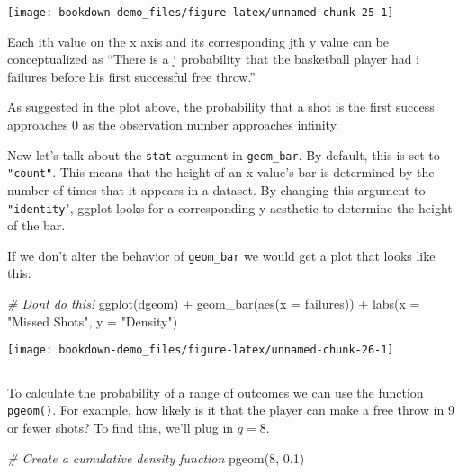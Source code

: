 \documentclass[
]{book}
\newenvironment{Shaded}{\begin{snugshade}}{\end{snugshade}}
\newcommand{\AttributeTok}[1]{\textcolor[rgb]{0.77,0.63,0.00}{#1}}
\newcommand{\CommentTok}[1]{\textcolor[rgb]{0.56,0.35,0.01}{\textit{#1}}}
\newcommand{\DecValTok}[1]{\textcolor[rgb]{0.00,0.00,0.81}{#1}}
\newcommand{\FloatTok}[1]{\textcolor[rgb]{0.00,0.00,0.81}{#1}}
\newcommand{\FunctionTok}[1]{\textcolor[rgb]{0.00,0.00,0.00}{#1}}
\newcommand{\NormalTok}[1]{#1}
\newcommand{\SpecialCharTok}[1]{\textcolor[rgb]{0.00,0.00,0.00}{#1}}
\newcommand{\StringTok}[1]{\textcolor[rgb]{0.31,0.60,0.02}{#1}}
\begin{document}
\begin{center}\texttt{[image: bookdown-demo\_files/figure-latex/unnamed-chunk-25-1]} \end{center}

Each ith value on the x axis and its corresponding jth y value can be conceptualized as ``There is a j probability that the basketball player had i failures before his first successful free throw.''

As suggested in the plot above, the probability that a shot is the first success approaches 0 as the observation number approaches infinity.

Now let's talk about the \texttt{stat} argument in \texttt{geom\_bar}. By default, this is set to \texttt{"count"}. This means that the height of an x-value's bar is determined by the number of times that it appears in a dataset. By changing this argument to \texttt{"identity}", ggplot looks for a corresponding y aesthetic to determine the height of the bar.

If we don't alter the behavior of \texttt{geom\_bar} we would get a plot that looks like this:

\begin{Shaded}
\begin{Highlighting}[]
\CommentTok{\# Don\textquotesingle{}t do this!}
\FunctionTok{ggplot}\NormalTok{(dgeom) }\SpecialCharTok{+}
  \FunctionTok{geom\_bar}\NormalTok{(}\FunctionTok{aes}\NormalTok{(}\AttributeTok{x =}\NormalTok{ failures)) }\SpecialCharTok{+}
  \FunctionTok{labs}\NormalTok{(}\AttributeTok{x =} \StringTok{"Missed Shots"}\NormalTok{, }\AttributeTok{y =} \StringTok{"Density"}\NormalTok{)}
\end{Highlighting}
\end{Shaded}

\begin{center}\texttt{[image: bookdown-demo\_files/figure-latex/unnamed-chunk-26-1]} \end{center}

\begin{center}\rule{0.5\linewidth}{0.5pt}\end{center}

To calculate the probability of a range of outcomes we can use the function \texttt{pgeom()}. For example, how likely is it that the player can make a free throw in 9 or fewer shots? To find this, we'll plug in \(q = 8\).

\begin{Shaded}
\begin{Highlighting}[]
\CommentTok{\# Create a cumulative density function}
\FunctionTok{pgeom}\NormalTok{(}\DecValTok{8}\NormalTok{, }\FloatTok{0.1}\NormalTok{)}
\end{Highlighting}
\end{Shaded}
\end{document}
